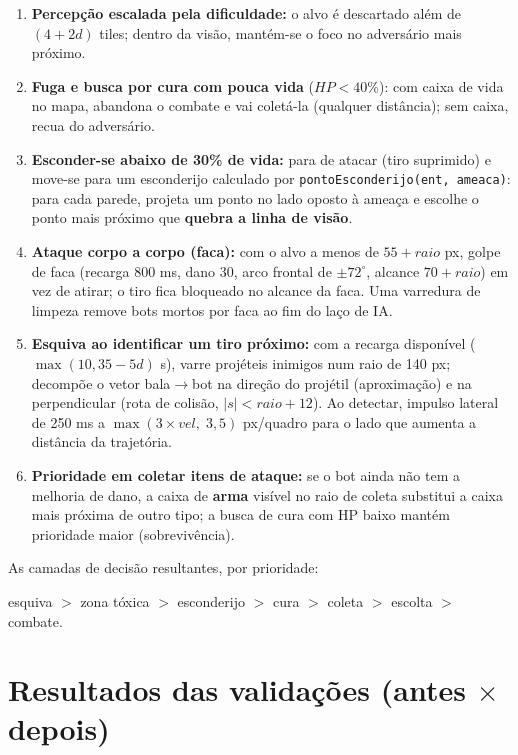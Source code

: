 \documentclass[a4paper,12pt]{article}
\begin{document}
\begin{enumerate}
  \item \textbf{Percepção escalada pela dificuldade:} o alvo é descartado além de
        $(4 + 2d)$ tiles; dentro da visão, mantém-se o foco no adversário mais próximo.
  \item \textbf{Fuga e busca por cura com pouca vida} ($HP < 40\%$): com caixa de vida no
        mapa, abandona o combate e vai coletá-la (qualquer distância); sem caixa, recua do
        adversário.
  \item \textbf{Esconder-se abaixo de 30\% de vida:} para de atacar (tiro suprimido) e move-se
        para um esconderijo calculado por \texttt{pontoEsconderijo(ent, ameaca)}: para cada
        parede, projeta um ponto no lado oposto à ameaça e escolhe o ponto mais próximo que
        \textbf{quebra a linha de visão}.
  \item \textbf{Ataque corpo a corpo (faca):} com o alvo a menos de $55 + raio$ px, golpe de
        faca (recarga 800 ms, dano 30, arco frontal de $\pm 72^{\circ}$, alcance
        $70 + raio$) em vez de atirar; o tiro fica bloqueado no alcance da faca. Uma
        varredura de limpeza remove bots mortos por faca ao fim do laço de IA.
  \item \textbf{Esquiva ao identificar um tiro próximo:} com a recarga disponível
        ($\max(10, 35-5d)$ s), varre projéteis inimigos num raio de 140 px; decompõe o vetor
        bala$\to$bot na direção do projétil (aproximação) e na perpendicular (rota de
        colisão, $|s| < raio + 12$). Ao detectar, impulso lateral de 250 ms a
        $\max(3 \times vel,\; 3{,}5)$ px/quadro para o lado que aumenta a distância da
        trajetória.
  \item \textbf{Prioridade em coletar itens de ataque:} se o bot ainda não tem a melhoria de
        dano, a caixa de \textbf{arma} visível no raio de coleta substitui a caixa mais
        próxima de outro tipo; a busca de cura com HP baixo mantém prioridade maior
        (sobrevivência).
\end{enumerate}

As camadas de decisão resultantes, por prioridade:
\begin{center}
  esquiva $>$ zona tóxica $>$ esconderijo $>$ cura $>$ coleta $>$ escolta $>$ combate.
\end{center}

\newpage

\section{Resultados das validações (antes $\times$ depois)}
\end{document}
